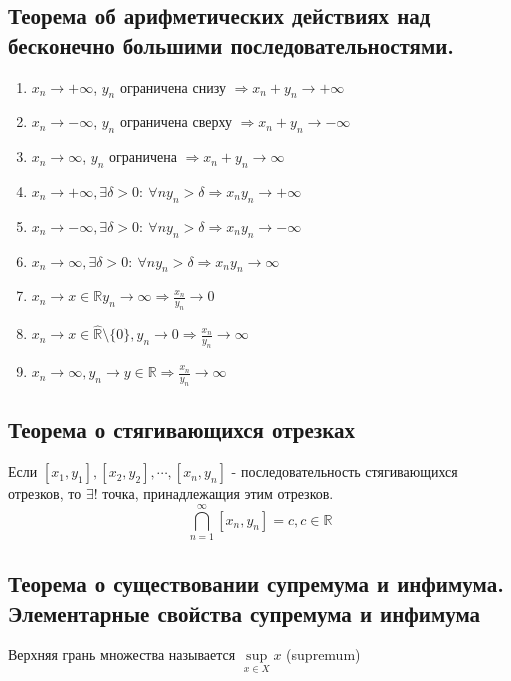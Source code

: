 \documentclass{article}
\begin{document}
\subsection{Теорема об арифметических действиях над бесконечно большими последовательностями.}
\begin{enumerate}
	\item $x_n \to +\infty$, $y_n$ ограничена снизу $\Rightarrow x_n + y_n \to +\infty$
	\item $x_n \to -\infty$, $y_n$ ограничена сверху $\Rightarrow x_n + y_n \to -\infty$
	\item $x_n \to \infty$, $y_n$ ограничена $\Rightarrow x_n + y_n \to \infty$
	\item $x_n \to +\infty, \exists\delta > 0:\ \forall n y_n > \delta \Rightarrow x_ny_n \to +\infty$
	\item $x_n \to -\infty, \exists\delta > 0:\ \forall n y_n > \delta \Rightarrow x_ny_n \to -\infty$
	\item $x_n \to \infty, \exists\delta > 0:\ \forall n y_n > \delta \Rightarrow x_ny_n \to \infty$
	\item $x_n \to x \in \mathbb{R} y_n \to \infty \Rightarrow \frac{x_n}{y_n} \to 0$
	\item $x_n \to x \in \hat{\mathbb{R}}\setminus\{0\}, y_n \to 0 \Rightarrow \frac{x_n}{y_n} \to \infty$
	\item $x_n \to \infty, y_n \to y \in \mathbb{R} \Rightarrow  \frac{x_n}{y_n} \to \infty$
\end{enumerate}

\subsection{Теорема о стягивающихся отрезках}
 Если $[x_1, y_1], [x_2, y_2], \cdots, [x_n, y_n]$ - последовательность стягивающихся отрезков, то $\exists!$ точка, принадлежащия этим отрезков.
\begin{equation*}
	\displaystyle\bigcap\limits_{n = 1}^{\infty}[x_n, y_n] = c, c \in \mathbb{R}
\end{equation*}

\subsection{Теорема о существовании супремума и инфимума. Элементарные свойства супремума и инфимума}

 Верхняя грань множества называется $\sup\limits_{x \in X}x$ (supremum)
\end{document}
